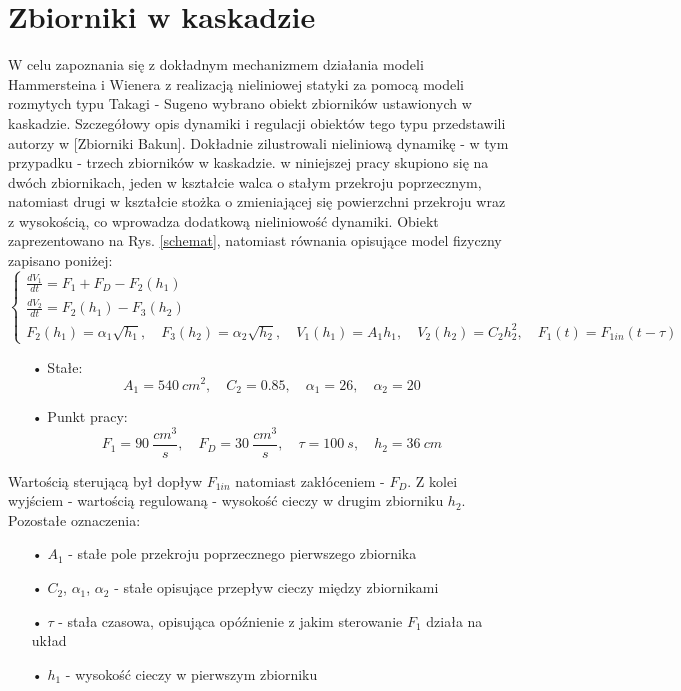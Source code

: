 \chapter{Zbiorniki w kaskadzie}
W celu zapoznania się z dokładnym mechanizmem działania modeli Hammersteina i Wienera z realizacją nieliniowej statyki za pomocą modeli rozmytych typu Takagi - Sugeno wybrano obiekt zbiorników ustawionych w kaskadzie. Szczegółowy opis dynamiki i regulacji obiektów tego typu przedstawili autorzy w [Zbiorniki Bakun]. Dokładnie zilustrowali nieliniową dynamikę - w tym przypadku - trzech zbiorników w kaskadzie. w niniejszej pracy skupiono się na dwóch zbiornikach, jeden w kształcie walca o stałym przekroju poprzecznym, natomiast drugi w kształcie stożka o zmieniającej się powierzchni przekroju wraz z wysokością, co wprowadza dodatkową nieliniowość dynamiki. Obiekt zaprezentowano na Rys. \ref{schemat}, natomiast równania opisujące model fizyczny zapisano poniżej:
\begin{equation}
\begin{cases}
\frac{dV_1}{dt} = F_1 + F_D - F_2(h_1) \\[10pt]
\frac{dV_2}{dt} = F_2(h_1) - F_3(h_2) \\[10pt]
F_2(h_1) = \alpha_1 \sqrt{h_1}, \quad F_3(h_2) = \alpha_2 \sqrt{h_2}, \quad V_1(h_1) = A_1h_1, \quad V_2(h_2) = C_2h_2^2, \quad F_1(t) = F_{1in}(t-\tau)  
\end{cases}
\label{model_fiz}
\end{equation}

\begin{itemize}
\item[•] Stałe: 
\begin{equation}
A_1 = 540\ cm^2, \quad C_2 = \num{0.85}, \quad \alpha_1 = 26, \quad \alpha_2 = 20
\end{equation}

\item[•] Punkt pracy:
\begin{equation}
F_1 = 90\ \frac{cm^3}{s}, \quad F_D = 30\ \frac{cm^3}{s}, \quad \tau = 100\ s, \quad h_2 = 36\ cm
\end{equation}
\end{itemize}

Wartością sterującą był dopływ $F_{1in}$ natomiast zakłóceniem - $F_D$. Z kolei wyjściem - wartością regulowaną - wysokość cieczy w drugim zbiorniku $h_2$. Pozostałe oznaczenia:
\begin{itemize}
\item[•] $A_1$ - stałe pole przekroju poprzecznego pierwszego zbiornika\\
\item[•] $C_2$, $\alpha_1$, $\alpha_2$ - stałe opisujące przepływ cieczy między zbiornikami\\
\item[•] $\tau$ - stała czasowa, opisująca opóźnienie z jakim sterowanie $F_1$ działa na układ\\
\item[•] $h_1$ - wysokość cieczy w pierwszym zbiorniku\\
\end{itemize}

